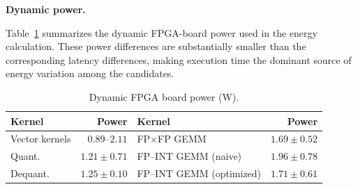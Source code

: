 \documentclass[sigconf,anonymous,nonacm]{acmart}
\newcommand{\fpint}{FP-INT}
\begin{document}
\textbf{Dynamic power.}

Table~\ref{tab:kernel-dynamic-power} summarizes the dynamic FPGA-board power used in the energy calculation.
These power differences are substantially smaller than the corresponding latency differences, making execution time the dominant source of energy variation among the candidates.

\begin{table}[t]
    \centering
    \caption{Dynamic FPGA board power (W).}
    \label{tab:kernel-dynamic-power}
    \setlength{\tabcolsep}{1.3pt}
    \begin{tabular*}{\columnwidth}
        {@{\extracolsep{\fill}}lrlr@{}}
        \toprule
        Kernel & Power & Kernel & Power \\
        \midrule
        Vector kernels & $0.89$--$2.11$
            & FP$\times$FP GEMM & $1.69 \pm 0.52$ \\
        Quant. & $1.21 \pm 0.71$
            & FP--INT GEMM (naive) & $1.96 \pm 0.78$ \\
        Dequant. & $1.25 \pm 0.10$
            & FP--INT GEMM (optimized) & $1.71 \pm 0.61$ \\
        \bottomrule
    \end{tabular*}
\end{table}
\end{document}
